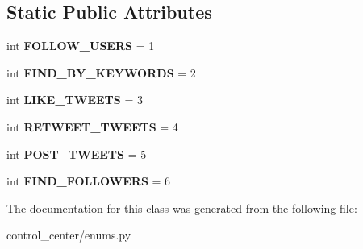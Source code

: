 \subsection*{Static Public Attributes}
\begin{DoxyCompactItemize}
\item 
\mbox{\label{classtwitter_1_1control__center_1_1enums_1_1ResponseTypes_ae730dee107c0ceced428c11c89d3cf55}} 
int {\bfseries F\+O\+L\+L\+O\+W\+\_\+\+U\+S\+E\+RS} = 1
\item 
\mbox{\label{classtwitter_1_1control__center_1_1enums_1_1ResponseTypes_ad981b4a159fa5c0ac5ada90e1165099c}} 
int {\bfseries F\+I\+N\+D\+\_\+\+B\+Y\+\_\+\+K\+E\+Y\+W\+O\+R\+DS} = 2
\item 
\mbox{\label{classtwitter_1_1control__center_1_1enums_1_1ResponseTypes_a7b85cfde98eff7d69ec16d6bc6f019cf}} 
int {\bfseries L\+I\+K\+E\+\_\+\+T\+W\+E\+E\+TS} = 3
\item 
\mbox{\label{classtwitter_1_1control__center_1_1enums_1_1ResponseTypes_a29f6317f18e2560582a7c0e4d57ffaa2}} 
int {\bfseries R\+E\+T\+W\+E\+E\+T\+\_\+\+T\+W\+E\+E\+TS} = 4
\item 
\mbox{\label{classtwitter_1_1control__center_1_1enums_1_1ResponseTypes_aea9068ca1d2140ce2ffd41d2609141f6}} 
int {\bfseries P\+O\+S\+T\+\_\+\+T\+W\+E\+E\+TS} = 5
\item 
\mbox{\label{classtwitter_1_1control__center_1_1enums_1_1ResponseTypes_add3b1e9f25232e004ee2cd9977d39782}} 
int {\bfseries F\+I\+N\+D\+\_\+\+F\+O\+L\+L\+O\+W\+E\+RS} = 6
\end{DoxyCompactItemize}


The documentation for this class was generated from the following file\+:\begin{DoxyCompactItemize}
\item 
control\+\_\+center/enums.\+py\end{DoxyCompactItemize}

